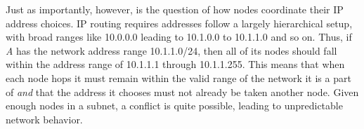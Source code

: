 \par Just as importantly, however, is the question of how nodes coordinate their IP address choices. IP routing requires addresses follow a largely hierarchical setup, with broad ranges like 10.0.0.0 leading to 10.1.0.0 to 10.1.1.0 and so on. Thus, if \textit{A} has the network address range 10.1.1.0/24, then all of its nodes should fall within the address range of 10.1.1.1 through 10.1.1.255. This means that when each node hops it must remain within the valid range of the network it is a part of \textit{and} that the address it chooses must not already be taken another node. Given enough nodes in a subnet, a conflict is quite possible, leading to unpredictable network behavior. 



